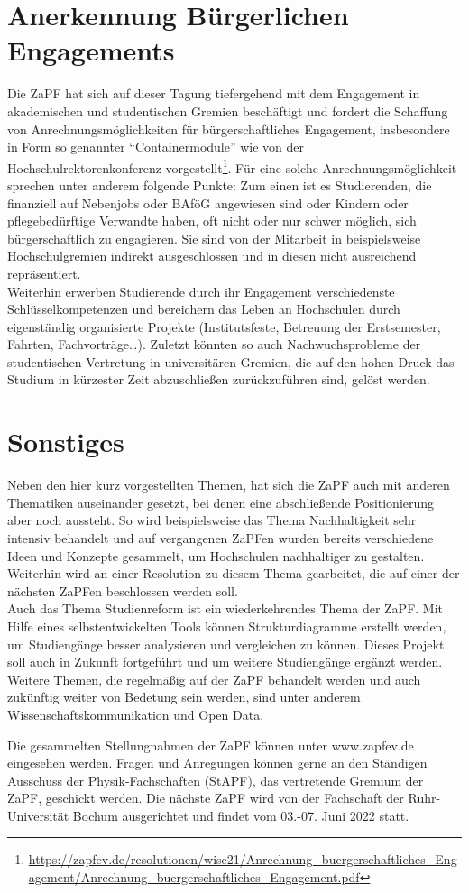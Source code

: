 \section*{Anerkennung Bürgerlichen Engagements}
Die ZaPF hat sich auf dieser Tagung tiefergehend mit dem Engagement in akademischen und studentischen Gremien beschäftigt und fordert die Schaffung von Anrechnungsmöglichkeiten für bürgerschaftliches Engagement, insbesondere in Form so genannter “Containermodule” wie von der Hochschulrektorenkonferenz vorgestellt\footnote{\url{https://zapfev.de/resolutionen/wise21/Anrechnung_buergerschaftliches_Engagement/Anrechnung_buergerschaftliches_Engagement.pdf}}. Für eine solche Anrechnungsmöglichkeit sprechen unter anderem folgende Punkte: Zum einen ist es Studierenden, die finanziell auf Nebenjobs oder BAföG angewiesen sind oder Kindern oder pflegebedürftige Verwandte haben, oft nicht oder nur schwer möglich, sich bürgerschaftlich zu engagieren. Sie sind von der Mitarbeit in beispielsweise Hochschulgremien indirekt ausgeschlossen und in diesen nicht ausreichend repräsentiert.\\ Weiterhin erwerben Studierende durch ihr Engagement verschiedenste Schlüsselkompetenzen und bereichern das Leben an Hochschulen durch eigenständig organisierte Projekte (Institutsfeste, Betreuung der Erstsemester, Fahrten, Fachvorträge…). Zuletzt könnten so auch   Nachwuchsprobleme der studentischen Vertretung in universitären Gremien, die auf den hohen Druck das Studium in kürzester Zeit abzuschließen zurückzuführen sind, gelöst werden.

\section*{Sonstiges}
Neben den hier kurz vorgestellten Themen, hat sich die ZaPF auch mit anderen Thematiken auseinander gesetzt, bei denen eine abschließende Positionierung aber noch aussteht. So wird beispielsweise das Thema Nachhaltigkeit sehr intensiv behandelt und auf vergangenen ZaPFen wurden bereits verschiedene Ideen und Konzepte gesammelt, um Hochschulen nachhaltiger zu gestalten. Weiterhin wird an einer Resolution zu diesem Thema gearbeitet, die auf einer der nächsten ZaPFen beschlossen werden soll.\\
Auch das Thema Studienreform ist ein wiederkehrendes Thema der ZaPF. Mit Hilfe eines selbstentwickelten Tools können Strukturdiagramme erstellt werden, um Studiengänge besser analysieren und vergleichen zu können. Dieses Projekt soll auch in Zukunft fortgeführt und um weitere Studiengänge ergänzt werden. \\
Weitere Themen, die regelmäßig auf der ZaPF behandelt werden und auch zukünftig weiter von Bedetung sein werden, sind unter anderem Wissenschaftskommunikation und Open Data. 

Die gesammelten Stellungnahmen der ZaPF können unter www.zapfev.de eingesehen werden. Fragen und Anregungen können gerne an den Ständigen Ausschuss der Physik-Fachschaften (StAPF), das vertretende Gremium der ZaPF, geschickt werden.
Die nächste ZaPF wird von der Fachschaft der Ruhr-Universität Bochum ausgerichtet und findet vom 03.-07. Juni 2022 statt.